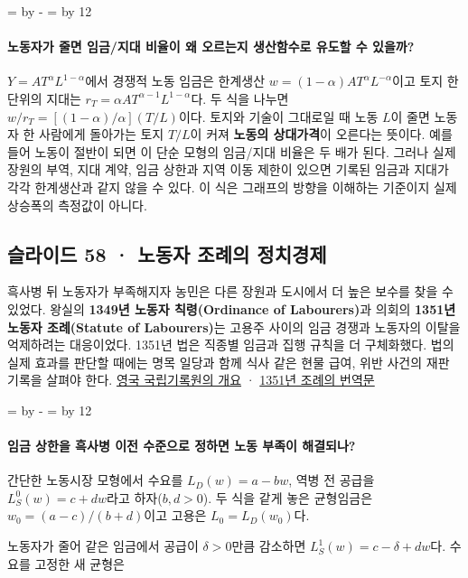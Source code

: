\documentclass[10pt,a4paper]{article}
\newcommand{\ReserveQuestionSpace}{%
  \par\begingroup
  \dimen0=\pagegoal \advance\dimen0 by -\pagetotal
  \dimen2=\baselineskip \multiply\dimen2 by 12
  \ifdim\dimen0<\dimen2 \newpage\fi
  \endgroup}
\begin{document}
\ReserveQuestionSpace
\paragraph{노동자가 줄면 임금/지대 비율이 왜 오르는지 생산함수로 유도할 수 있을까?}

$Y=AT^\alpha L^{1-\alpha}$에서 경쟁적 노동 임금은 한계생산 $w=(1-\alpha)AT^\alpha L^{-\alpha}$이고 토지 한 단위의 지대는 $r_T=\alpha AT^{\alpha-1}L^{1-\alpha}$다. 두 식을 나누면 $w/r_T=[(1-\alpha)/\alpha](T/L)$이다. 토지와 기술이 그대로일 때 노동 $L$이 줄면 노동자 한 사람에게 돌아가는 토지 $T/L$이 커져 \textbf{노동의 상대가격}이 오른다는 뜻이다. 예를 들어 노동이 절반이 되면 이 단순 모형의 임금/지대 비율은 두 배가 된다. 그러나 실제 장원의 부역, 지대 계약, 임금 상한과 지역 이동 제한이 있으면 기록된 임금과 지대가 각각 한계생산과 같지 않을 수 있다. 이 식은 그래프의 방향을 이해하는 기준이지 실제 상승폭의 측정값이 아니다.\par

\subsection{슬라이드 58 · 노동자 조례의 정치경제}
흑사병 뒤 노동자가 부족해지자 농민은 다른 장원과 도시에서 더 높은 보수를 찾을 수 있었다. 왕실의 \textbf{1349년 노동자 칙령(Ordinance of Labourers)}과 의회의 \textbf{1351년 노동자 조례(Statute of Labourers)}는 고용주 사이의 임금 경쟁과 노동자의 이탈을 억제하려는 대응이었다. 1351년 법은 직종별 임금과 집행 규칙을 더 구체화했다. 법의 실제 효과를 판단할 때에는 명목 일당과 함께 식사 같은 현물 급여, 위반 사건의 재판 기록을 살펴야 한다. \href{https://www.nationalarchives.gov.uk/explore-the-collection/explore-by-time-period/early-modern/plague/}{영국 국립기록원의 개요} · \href{https://sourcebooks.web.fordham.edu/seth/statute-labourers.asp}{1351년 조례의 번역문}\par

\ReserveQuestionSpace
\paragraph{임금 상한을 흑사병 이전 수준으로 정하면 노동 부족이 해결되나?}
간단한 노동시장 모형에서 수요를 $L_D(w)=a-bw$, 역병 전 공급을 $L_S^0(w)=c+dw$라고 하자($b,d>0$). 두 식을 같게 놓은 균형임금은 $w_0=(a-c)/(b+d)$이고 고용은 $L_0=L_D(w_0)$다.\par

노동자가 줄어 같은 임금에서 공급이 $\delta>0$만큼 감소하면 $L_S^1(w)=c-\delta+dw$다. 수요를 고정한 새 균형은\par
\end{document}
